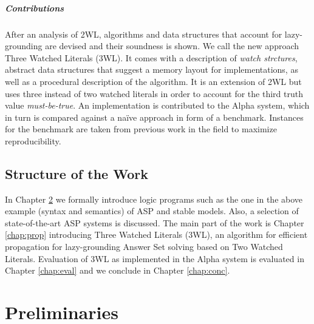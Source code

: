 \documentclass{vutinfth} %
\newcommand{\mbt}{must-be-true\xspace}
\begin{document}


\paragraph{Contributions} After an analysis of 2WL, algorithms and data structures that account for lazy-grounding are devised and their soundness is shown. We call the new approach Three Watched Literals (3WL). It comes with a description of \emph{watch strctures}, abstract data structures that suggest a memory layout for implementations, as well as a procedural description of the algorithm. It is an extension of 2WL but uses three instead of two watched literals in order to account for the third truth value \emph{\mbt}. An implementation is contributed to the Alpha system, which in turn is compared against a na{\"i}ve approach in form of a benchmark. Instances for the benchmark are taken from previous work in the field to maximize reproducibility.

\section{Structure of the Work}

In Chapter \ref{chap:prelim} we formally introduce logic programs such as the one in the above example (syntax and semantics) of ASP and stable models. Also, a selection of state-of-the-art ASP systems is discussed. The main part of the work is Chapter \ref{chap:prop} introducing Three Watched Literals (3WL), an algorithm for efficient propagation for lazy-grounding Answer Set solving based on Two Watched Literals. Evaluation of 3WL as implemented in the Alpha system is evaluated in Chapter \ref{chap:eval} and we conclude in Chapter \ref{chap:conc}.

\chapter{Preliminaries}
\label{chap:prelim}
\end{document}

